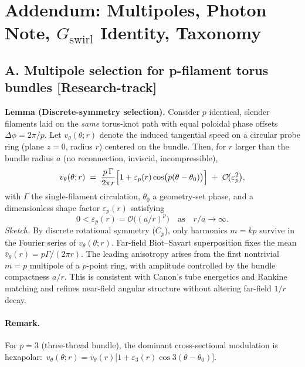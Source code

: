 \documentclass[10pt,reprint,aps,onecolumn,nofootinbib]{revtex4-2}
\newcommand{\statusResearch}{\textsf{[Research-track]}}
\begin{document}

    \section*{Addendum: Multipoles, Photon Note, \(G_{\text{swirl}}\) Identity, Taxonomy}

    \subsection*{A. Multipole selection for p-filament torus bundles \statusResearch}
        \textbf{Lemma (Discrete-symmetry selection).}
        Consider \(p\) identical, slender filaments laid on the \emph{same} torus-knot path with equal poloidal phase offsets \(\Delta\phi=2\pi/p\). Let \(v_\theta(\theta;r)\) denote the induced tangential speed on a circular probe ring (plane \(z=0\), radius \(r\)) centered on the bundle. Then, for \(r\) larger than the bundle radius \(a\) (no reconnection, inviscid, incompressible),
        \[
            v_\theta(\theta;r)\;=\;\frac{p\,\Gamma}{2\pi r}\Bigl[1+\varepsilon_p(r)\cos\!\big(p(\theta-\theta_0)\big)\Bigr]
            \;+\;\mathcal{O}\!\big(\varepsilon_p^2\big),
        \]
        with \(\Gamma\) the single-filament circulation, \(\theta_0\) a geometry-set phase, and a dimensionless shape factor \(\varepsilon_p(r)\) satisfying
        \[
            0<\varepsilon_p(r)=\mathcal{O}\!\big((a/r)^p\big)\quad\text{as}\quad r/a\to\infty.
        \]
        \emph{Sketch.} By discrete rotational symmetry (\(C_p\)), only harmonics \(m=kp\) survive in the Fourier series of \(v_\theta(\theta;r)\). Far-field Biot–Savart superposition fixes the mean \(\bar v_\theta(r)=p\Gamma/(2\pi r)\). The leading anisotropy arises from the first nontrivial \(m=p\) multipole of a \(p\)-point ring, with amplitude controlled by the bundle compactness \(a/r\). This is consistent with Canon’s tube energetics and Rankine matching and refines near-field angular structure without altering far-field \(1/r\) decay.

        \paragraph{Remark.}
            For \(p=3\) (three-thread bundle), the dominant cross-sectional modulation is hexapolar:
            \(\,v_\theta(\theta;r)=\bar v_\theta(r)\big[1+\varepsilon_3(r)\cos 3(\theta-\theta_0)\big]\).
\end{document}
